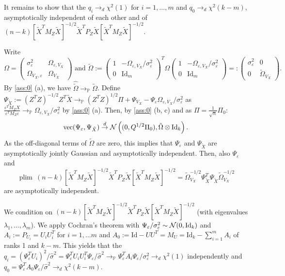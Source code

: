\documentclass[11pt,hidelinks,a4paper]{article}
\newcommand{\BP}{{\mathbb{P}}}
\newcommand{\CN}{{\cal N}}
\DeclareMathOperator*{\plim}{plim}
\DeclareMathOperator{\vecop}{vec}
\newcommand{\Id}{\mathrm{Id}}
\newcommand{\tod}{\overset{d}{\to}}
\begin{document}
\begin{proofEnd}
    It remains to show that the $q_i \to_d \chi^2(1)$ for $i = 1, \ldots, m$ and $q_0 \to_d \chi^2(k - m)$, asymptotically independent of each other and of $(n - k) [\tilde X^T M_Z \tilde X ]^{-1/2} \tilde X^T P_Z \tilde X [\tilde X^T M_Z \tilde X ]^{-1/2} $.

    Write
    $$
    \Omega = \begin{pmatrix} \sigma^2_\varepsilon & \Omega_{\varepsilon, V_X} \\ \Omega_{V_X, \varepsilon} & \Omega_{V_X} \end{pmatrix} \text{ and } \tilde \Omega :=         \begin{pmatrix}
            1 & -\Omega_{\varepsilon, V_X} / \sigma^2_\varepsilon \\ 0 & \Id_m
        \end{pmatrix}^T \Omega         \begin{pmatrix}
            1 & -\Omega_{\varepsilon, V_X} / \sigma^2_\varepsilon \\ 0 & \Id_m
        \end{pmatrix} =: \begin{pmatrix}
            \sigma^2_\varepsilon & 0 \\
            0 & \tilde \Omega_{V_X}
        \end{pmatrix}.
    $$
    By \cref{ass:0} (a), we have $\widehat{\tilde \Omega} \to_\BP \tilde \Omega$.
    Define $\Psi_{\tilde X} := (Z^T Z)^{-1/2} Z^T \tilde X \to_\BP (Z^T Z)^{1/2} \Pi + \Psi_{V_X} - \Psi_{\varepsilon} \Omega_{\varepsilon, V_X} / \sigma^2_\varepsilon$ as $\frac{\varepsilon^T M_Z X}{\varepsilon^T M_Z \varepsilon} \to_\BP \Omega_{\varepsilon, V_X} / \sigma^2_\varepsilon$ by \cref{ass:0} (a).
    Then, by \cref{ass:0} (b, c) and as $\Pi = \frac{1}{\sqrt{n}} \Pi_0$:
    $$\vecop(\Psi_\varepsilon, \Psi_{\tilde X} ) \tod \CN \left( (0, Q^{1/2} \Pi_0), \tilde \Omega \otimes \Id_k \right).
    $$
    As the off-diagonal terms of $\tilde \Omega$ are zero, this implies that $\Psi_\varepsilon$ and $\Psi_{\tilde X}$ are asymptotically jointly Gaussian and asymptotically independent.
    Then, also $\Psi_\varepsilon$ and 
    $$\plim \ (n - k) [\tilde X^T M_Z \tilde X ]^{-1/2} \tilde X^T P_Z \tilde X [\tilde X^T M_Z \tilde X ]^{-1/2} = \tilde \Omega_{V_X}^{-1/2} \Psi_{\tilde X}^T \Psi_{\tilde X} \tilde \Omega_{V_X}^{-1/2}$$
    are asymptotically independent.
    
    We condition on $ (n - k) [\tilde X^T M_Z \tilde X ]^{-1/2} \tilde X^T P_Z \tilde X [\tilde X^T M_Z \tilde X ]^{-1/2}$ (with eigenvalues $\lambda_1, \ldots, \lambda_m$).
    We apply Cochran's theorem with $\Psi_\varepsilon / \sigma_\varepsilon^2 \sim \CN(0, \Id_k)$ and $A_i := P_{U_i} = U_i U_i^T$ for $i=1, \ldots m$ and $A_0 := \Id - U U^T = M_U = \Id_k - \sum_{i=1}^m A_i$ of ranks 1 and $k-m$.
    This yields that the $q_i = (\Psi_\varepsilon^T U_i)^2 / \hat\sigma^2 = \Psi_\varepsilon^T U_i U_i^T \Psi_\varepsilon / \hat\sigma^2 \to_\BP \Psi_\varepsilon^T A_i \Psi_\varepsilon / \sigma^2_\varepsilon \to_d \chi^2(1)$ independently and $q_0 = \Psi_\varepsilon^T A_0 \Psi_\varepsilon / \hat\sigma^2 \to_d \chi^2(k - m)$.
\end{proofEnd}
\end{document}
